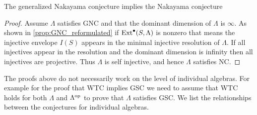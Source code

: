 %		
%		
%		
%

\begin{prop}\cite{AR75} 
	The generalized Nakayama conjecture implies the Nakayama conjecture
	\begin{proof}
		Assume $\Lambda$ satisfies GNC and that the dominant dimension of $\Lambda$ is $\infty$. As shown in \cref{prop:GNC_reformulated} if $\operatorname{Ext}^\bullet(S, \Lambda)$ is nonzero that means the injective envelope $I(S)$ appears in the minimal injective resolution of $\Lambda$. If all injectives appear in the resolution and the dominant dimension is infinity then all injectives are projective. Thus $\Lambda$ is self injective, and hence $\Lambda$ satisfies NC. 
	\end{proof}
\end{prop}

The proofs above do not necessarily work on the level of individual algebras. For example for the proof that WTC implies GSC we need to assume that WTC holds for both $\Lambda$ and $\Lambda^{\operatorname{op}}$ to prove that $\Lambda$ satisfies GSC. We list the relationships between the conjectures for individual algebras.


